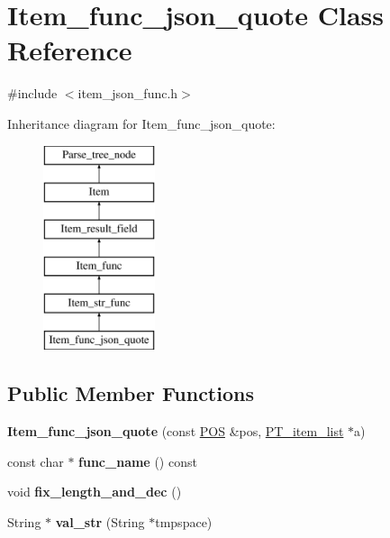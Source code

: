 \hypertarget{classItem__func__json__quote}{}\section{Item\+\_\+func\+\_\+json\+\_\+quote Class Reference}
\label{classItem__func__json__quote}


{\ttfamily \#include $<$item\+\_\+json\+\_\+func.\+h$>$}

Inheritance diagram for Item\+\_\+func\+\_\+json\+\_\+quote\+:\begin{figure}[H]
\begin{center}
\leavevmode
\includegraphics[height=6.000000cm]{classItem__func__json__quote}
\end{center}
\end{figure}
\subsection*{Public Member Functions}
\begin{DoxyCompactItemize}
\item 
\mbox{\label{classItem__func__json__quote_aacffb0786b1febd0208a8094f6534b43}} 
{\bfseries Item\+\_\+func\+\_\+json\+\_\+quote} (const \mbox{\hyperlink{structYYLTYPE}{P\+OS}} \&pos, \mbox{\hyperlink{classPT__item__list}{P\+T\+\_\+item\+\_\+list}} $\ast$a)
\item 
\mbox{\label{classItem__func__json__quote_ae2a064f3b04b6184853367b28a2ce628}} 
const char $\ast$ {\bfseries func\+\_\+name} () const
\item 
\mbox{\label{classItem__func__json__quote_a563ef8de58922e7474ee875f3e6c33e9}} 
void {\bfseries fix\+\_\+length\+\_\+and\+\_\+dec} ()
\item 
\mbox{\label{classItem__func__json__quote_a957b3513366c6b04df754aec4387ae7c}} 
String $\ast$ {\bfseries val\+\_\+str} (String $\ast$tmpspace)
\end{DoxyCompactItemize}
